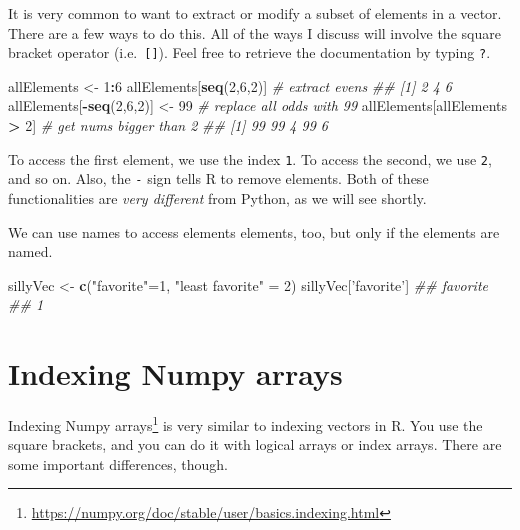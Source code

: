 \documentclass[12pt,krantz2]{krantz}
\makeatletter
\newenvironment{Shaded}{\begin{snugshade}}{\end{snugshade}}
\newcommand{\CommentTok}[1]{\textcolor[rgb]{0.37,0.37,0.37}{\textit{#1}}}
\newcommand{\DecValTok}[1]{\textcolor[rgb]{0.06,0.06,0.06}{#1}}
\newcommand{\KeywordTok}[1]{\textcolor[rgb]{0.27,0.27,0.27}{\textbf{#1}}}
\newcommand{\NormalTok}[1]{#1}
\newcommand{\OperatorTok}[1]{\textcolor[rgb]{0.43,0.43,0.43}{\textbf{#1}}}
\newcommand{\StringTok}[1]{\textcolor[rgb]{0.5,0.5,0.5}{#1}}
\renewcommand{\href}[2]{#2\footnote{\url{#1}}}
\newenvironment{kframe}{%
\medskip{}
\setlength{\fboxsep}{.8em}
 \def\at@end@of@kframe{}%
 \ifinner\ifhmode%
  \def\at@end@of@kframe{\end{minipage}}%
  \begin{minipage}{\columnwidth}%
 \fi\fi%
 \def\FrameCommand##1{\hskip\@totalleftmargin \hskip-\fboxsep
 \colorbox{shadecolor}{##1}\hskip-\fboxsep
     \hskip-\linewidth \hskip-\@totalleftmargin \hskip\columnwidth}%
 \MakeFramed {\advance\hsize-\width
   \@totalleftmargin\z@ \linewidth\hsize
   \@setminipage}}%
 {\par\unskip\endMakeFramed%
 \at@end@of@kframe}
\renewenvironment{Shaded}{\begin{kframe}}{\end{kframe}}
\makeatother
\begin{document}
It is very common to want to extract or modify a subset of elements in a vector. There are a few ways to do this. All of the ways I discuss will involve the square bracket operator (i.e.~\texttt{{[}{]}}). Feel free to retrieve the documentation by typing \texttt{?\textquotesingle{}{[}\textquotesingle{}}.

\begin{Shaded}
\begin{Highlighting}[]
\NormalTok{allElements <-}\StringTok{ }\DecValTok{1}\OperatorTok{:}\DecValTok{6}
\NormalTok{allElements[}\KeywordTok{seq}\NormalTok{(}\DecValTok{2}\NormalTok{,}\DecValTok{6}\NormalTok{,}\DecValTok{2}\NormalTok{)] }\CommentTok{# extract evens}
\CommentTok{## [1] 2 4 6}
\NormalTok{allElements[}\OperatorTok{-}\KeywordTok{seq}\NormalTok{(}\DecValTok{2}\NormalTok{,}\DecValTok{6}\NormalTok{,}\DecValTok{2}\NormalTok{)] <-}\StringTok{ }\DecValTok{99} \CommentTok{# replace all odds with 99}
\NormalTok{allElements[allElements }\OperatorTok{>}\StringTok{ }\DecValTok{2}\NormalTok{] }\CommentTok{# get nums bigger than 2}
\CommentTok{## [1] 99 99  4 99  6}
\end{Highlighting}
\end{Shaded}

To access the first element, we use the index \texttt{1}. To access the second, we use \texttt{2}, and so on. Also, the \texttt{-} sign tells R to remove elements. Both of these functionalities are \emph{very different} from Python, as we will see shortly.

We can use names to access elements elements, too, but only if the elements are named.

\begin{Shaded}
\begin{Highlighting}[]
\NormalTok{sillyVec <-}\StringTok{ }\KeywordTok{c}\NormalTok{(}\StringTok{"favorite"}\NormalTok{=}\DecValTok{1}\NormalTok{, }\StringTok{"least favorite"}\NormalTok{ =}\StringTok{ }\DecValTok{2}\NormalTok{)}
\NormalTok{sillyVec[}\StringTok{'favorite'}\NormalTok{]}
\CommentTok{## favorite }
\CommentTok{##        1}
\end{Highlighting}
\end{Shaded}

\hypertarget{indexing-numpy-arrays}{%
\section{Indexing Numpy arrays}\label{indexing-numpy-arrays}}

\href{https://numpy.org/doc/stable/user/basics.indexing.html}{Indexing Numpy arrays} is very similar to indexing vectors in R. You use the square brackets, and you can do it with logical arrays or index arrays. There are some important differences, though.
\end{document}
